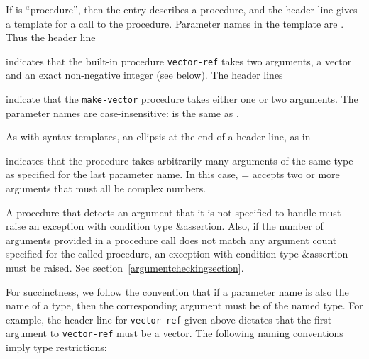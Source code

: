If  is ``procedure'', then the entry describes a procedure, and
the header line gives a template for a call to the procedure.  Parameter
names in the template are .  Thus the header line

\noindent{}\unpenalty

indicates that the built-in procedure {\tt vector-ref} takes
two arguments, a vector  and an exact non-negative integer
 (see below).  The header lines

\noindent%
\unpenalty

indicate that the {\tt make-vector} procedure takes
either one or two arguments.  The parameter names are
case-insensitive:  is the same as .

As with syntax templates, an ellipsis \dotsfoo{} at the end of a header
line, as in

\noindent{}\unpenalty

indicates that the procedure takes arbitrarily many arguments of the
same type as specified for the last parameter name.  In this case,
{\cf =} accepts two or more arguments that must all be complex
numbers.

\label{typeconventions}
A procedure that detects an argument that it is not specified to
handle must raise an exception with condition type
{\cf\&assertion}.  Also, if the
number of arguments provided in a procedure call does not match any
argument count specified for the called procedure, an exception with
condition type {\cf\&assertion} must be raised.
See section~\ref{argumentcheckingsection}.

For succinctness, we follow the convention
that if a parameter name is also the name of a type, then the corresponding argument must be of the named type.
For example, the header line for {\tt vector-ref} given above dictates that the
first argument to {\tt vector-ref} must be a vector.  The following naming
conventions imply type restrictions:


